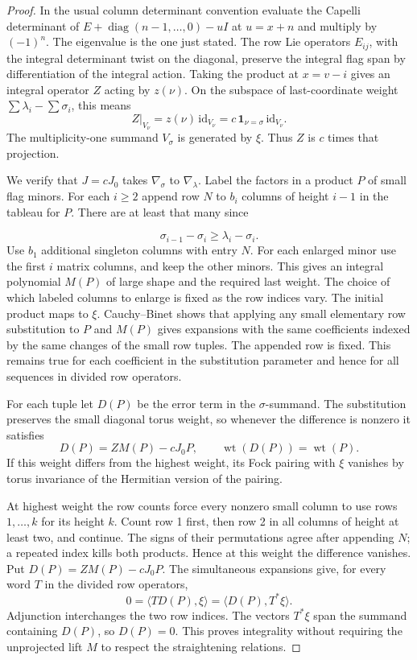 \begin{proof}
In the usual column determinant
convention evaluate the Capelli determinant of
\(E+\operatorname{diag}(n-1,\ldots,0)-uI\) at \(u=x+n\)
and multiply by \((-1)^n\). The eigenvalue is the one just
stated. \cite{molev-branching} The row Lie operators \(E_{ij}\), with the integral
determinant twist on the diagonal, preserve the integral flag
span by differentiation of the integral action. Taking the
product at \(x=v-i\) gives an integral operator \(Z\) acting
by \(z(\nu)\). On the subspace of last-coordinate weight
\(\sum\lambda_i-\sum\sigma_i\), this means
\[
       Z|_{V_\nu}=z(\nu)\,\mathrm{id}_{V_\nu}
               =c\,\mathbf1_{\nu=\sigma}\,\mathrm{id}_{V_\nu}.
\]
The multiplicity-one summand \(V_\sigma\) is generated by
\(\xi\). Thus \(Z\) is \(c\) times that projection.

We verify that \(J=cJ_0\) takes \(\nabla_\sigma\) to
\(\nabla_\lambda\). Label the factors in a product \(P\) of
small flag minors. For each \(i\ge2\) append row \(N\) to
\(b_i\) columns of height \(i-1\) in the tableau for \(P\).
There are at least that many since

\[
  \sigma_{i-1}-\sigma_i\ge\lambda_i-\sigma_i.
\]
Use \(b_1\) additional singleton columns with entry \(N\).
For each enlarged minor use the first \(i\) matrix columns,
and keep the other minors. This gives an integral polynomial
\(M(P)\) of large shape and the required last weight. The
choice of which labeled columns to enlarge is fixed as the
row indices vary. The initial product maps to \(\xi\).
Cauchy--Binet shows that applying any small elementary row
substitution to \(P\) and \(M(P)\) gives expansions with the
same coefficients indexed by the same changes of the small
row tuples. The appended row is fixed. This remains true for
each coefficient in the substitution parameter and hence for
all sequences in divided row operators.

For each tuple let \(D(P)\) be the error term in the \(\sigma\)-summand. The substitution preserves the small diagonal torus weight, so whenever the difference is nonzero it satisfies
\[
  D(P)=ZM(P)-cJ_0P,\qquad \operatorname{wt}(D(P))=\operatorname{wt}(P).
\]
If this weight differs from the highest weight, its Fock pairing
with \(\xi\) vanishes by torus invariance of the Hermitian
version of the pairing.

At highest weight the row counts force
every nonzero small column to use rows \(1,\ldots,k\) for its
height \(k\). Count row 1 first, then row 2 in all columns
of height at least two, and continue. The signs of their
permutations agree after appending \(N\); a repeated index
kills both products. Hence at this weight the difference
vanishes. Put \(D(P)=ZM(P)-cJ_0P\). The simultaneous expansions give,
for every word \(T\) in the divided row operators,
\[
              0=\langle T D(P),\xi\rangle
               =\langle D(P),T^*\xi\rangle .
\]
Adjunction interchanges the two row indices. The vectors
\(T^*\xi\) span the summand containing \(D(P)\), so \(D(P)=0\). This proves
integrality without requiring the unprojected lift \(M\) to
respect the straightening relations.


\end{proof}
